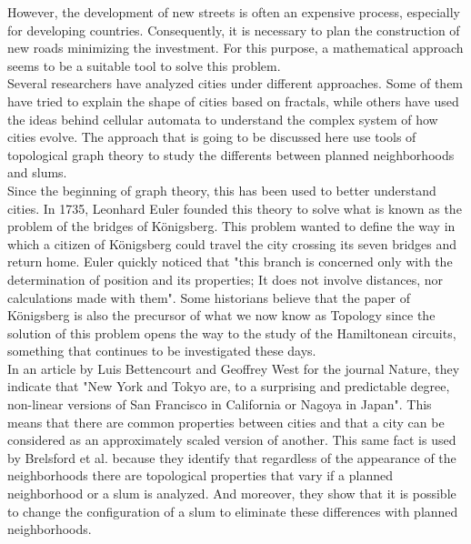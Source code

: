 \documentclass[10pt]{article}
\begin{document}
However, the development of new streets is often an expensive process, especially for developing countries. Consequently, it is necessary to plan the construction of new roads minimizing the investment. For this purpose, a mathematical approach seems to be a suitable tool to solve this problem\cite{bre}.\\

Several researchers have analyzed cities under different approaches. Some of them have tried to explain the shape of cities based on fractals, while others have used the ideas behind cellular automata to understand the complex system of how cities evolve\cite{d2019mathematics}. The approach that is going to be discussed here use tools of topological graph theory to study the differents between planned neighborhoods and slums\cite{bre}.\\

Since the beginning of graph theory, this has been used to better understand cities\cite{Ornes9686}. In 1735, Leonhard Euler founded this theory to solve what is known as the problem of the bridges of K\"{o}nigsberg\cite{alexanderson2006cover}. This problem wanted to define the way in which a citizen of K\"{o}nigsberg could travel the city crossing its seven bridges and return home. Euler quickly noticed that "this branch is concerned only with the determination of position and its properties; It does not involve distances, nor calculations made with them"\cite{alexanderson2006cover}. Some historians believe that the paper of K\"{o}nigsberg is also the precursor of what we now know as Topology since the solution of this problem opens the way to the study of the Hamiltonean circuits, something that continues to be investigated these days\cite{alexanderson2006cover}.\\

In an article by Luis Bettencourt and Geoffrey West for the journal Nature, they indicate that "New York and Tokyo are, to a surprising and predictable degree, non-linear versions of San Francisco in California or Nagoya in Japan"\cite{bettencourt2010unified}. This means that there are common properties between cities and that a city can be considered as an approximately scaled version of another. This same fact is used by  Brelsford et al. because they identify that regardless of the appearance of the neighborhoods there are topological properties that vary if a planned neighborhood or a slum is analyzed\cite{bre}. And moreover, they show that it is possible to change the configuration of a slum to eliminate these differences with planned neighborhoods\cite{bre}.\\
\end{document}
